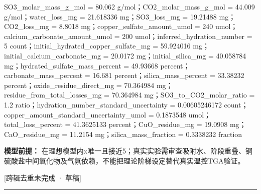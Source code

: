 \documentclass[UTF8,11pt,a4paper]{ctexart}
\begin{document}
SO3\_molar\_mass\_g\_mol = 80.062 g/mol；CO2\_molar\_mass\_g\_mol = 44.009 g/mol；water\_loss\_mg = 21.618336 mg；SO3\_loss\_mg = 19.21488 mg；CO2\_loss\_mg = 8.8018 mg；copper\_sulfate\_amount\_umol = 240 umol；calcium\_carbonate\_amount\_umol = 200 umol；inferred\_hydration\_number = 5 count；initial\_hydrated\_copper\_sulfate\_mg = 59.924016 mg；initial\_calcium\_carbonate\_mg = 20.0172 mg；initial\_silica\_mg = 40.058784 mg；hydrated\_sulfate\_mass\_percent = 49.93668 percent；carbonate\_mass\_percent = 16.681 percent；silica\_mass\_percent = 33.38232 percent；oxide\_residue\_direct\_mg = 70.364984 mg；residue\_from\_total\_losses\_mg = 70.364984 mg；SO3\_to\_CO2\_molar\_ratio = 1.2 ratio；hydration\_number\_standard\_uncertainty = 0.00605246172 count；copper\_amount\_standard\_uncertainty\_umol = 0.1873548 umol；total\_loss\_percent = 41.3625133 percent；CuO\_residue\_mg = 19.0908 mg；CaO\_residue\_mg = 11.2154 mg；silica\_mass\_fraction = 0.3338232 fraction\par
\noindent\textbf{模型前提：}
在理想模型内x唯一且接近5；真实实验需审查吸附水、阶段重叠、铜硫酸盐中间氧化物及气氛依赖，不能把理论阶梯设定替代真实温控TGA验证。\par
\noindent\textcolor{red!65!black}{[跨辑去重未完成 · 草稿]} \par
\medskip\hrule\medskip
{}
\end{document}
